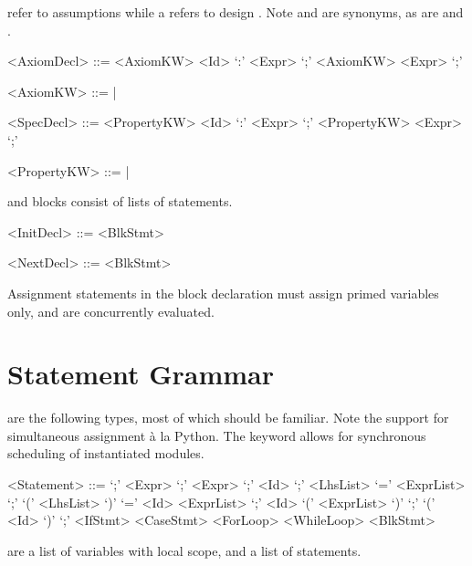  refer to assumptions while a  refers to design . Note  and  are synonyms, as are  and .

\begin{grammar}
     <AxiomDecl> ::= <AxiomKW> <Id> `:' <Expr> `;'
                 \alt <AxiomKW> <Expr> `;'

     <AxiomKW> ::=  | 

     <SpecDecl> ::= <PropertyKW> <Id> `:' <Expr> `;'
                 \alt <PropertyKW> <Expr> `;'

     <PropertyKW> ::=  | 
\end{grammar}

 and  blocks consist of lists of statements.
\begin{grammar}
     <InitDecl> ::=  <BlkStmt>

     <NextDecl> ::=  <BlkStmt>

\end{grammar}
Assignment statements in the  block declaration must
assign primed variables only, and are concurrently evaluated.

\section{Statement Grammar}
 are the following types, most of which should be familiar. Note the support for simultaneous assignment \`a la Python. The keyword  allows for synchronous scheduling of instantiated modules.
\begin{grammar}
     <Statement> 
       ::=  `;' 
       \alt {} <Expr> `;'
       \alt {} <Expr> `;'
       \alt {} <Id>  `;'
       \alt <LhsList> `=' <ExprList> `;'
       \alt {} `(' <LhsList> `)' `=' <Id> <ExprList> `;'
       \alt {} <Id> `(' <ExprList> `)' `;'
       \alt {} `(' <Id> `)' `;'
       \alt <IfStmt>
       \alt <CaseStmt>
       \alt <ForLoop>
       \alt <WhileLoop>
       \alt <BlkStmt>
\end{grammar}

 are a list of variables with local scope, and a list of statements.

